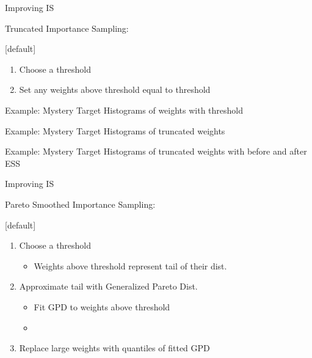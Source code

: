 \documentclass[14pt]{beamer}
\begin{document}
\begin{frame}{Improving IS}
    \begin{outline}
        \1 Truncated Importance Sampling:
            \2 \citep{Ion08} \newline
    \end{outline}

    [default]
    \begin{enumerate}
        \item Choose a threshold
        \item Set any weights above threshold equal to threshold
    \end{enumerate}
\end{frame}

\begin{frame}{Example: Mystery Target}
    Histograms of weights with threshold
\end{frame}

\begin{frame}{Example: Mystery Target}
    Histograms of truncated weights
\end{frame}

\begin{frame}{Example: Mystery Target}
    Histograms of truncated weights with before and after ESS
\end{frame}



\begin{frame}{Improving IS}
    \begin{outline}
    \1 Pareto Smoothed Importance Sampling:
        \2 \citep{Veh22} \newline
    \end{outline}

    [default]
    \begin{enumerate}
    \item Choose a threshold
        \begin{itemize}
            \item Weights above threshold represent tail of their dist.
        \end{itemize}
    \item Approximate tail with Generalized Pareto Dist.
    \begin{itemize}
        \item Fit GPD to weights above threshold
        \item \citep{Zha09}
    \end{itemize}
    \item Replace large weights with quantiles of fitted GPD
    \end{enumerate}
\end{frame}
\end{document}
